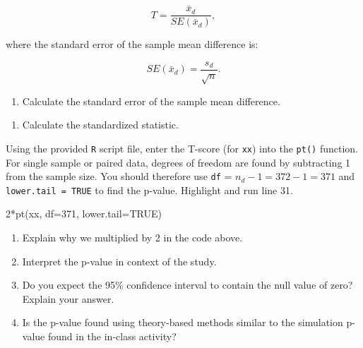 \documentclass[
]{report}
\newenvironment{Shaded}{\begin{snugshade}}{\end{snugshade}}
\newcommand{\AttributeTok}[1]{\textcolor[rgb]{0.77,0.63,0.00}{#1}}
\newcommand{\ConstantTok}[1]{\textcolor[rgb]{0.00,0.00,0.00}{#1}}
\newcommand{\DecValTok}[1]{\textcolor[rgb]{0.00,0.00,0.81}{#1}}
\newcommand{\FunctionTok}[1]{\textcolor[rgb]{0.00,0.00,0.00}{#1}}
\newcommand{\NormalTok}[1]{#1}
\newcommand{\SpecialCharTok}[1]{\textcolor[rgb]{0.00,0.00,0.00}{#1}}
\providecommand{\tightlist}{%
  \setlength{\itemsep}{0pt}\setlength{\parskip}{0pt}}
\begin{document}
\[T = \frac{\bar{x}_d}{SE(\bar{x}_d)},\]

where the standard error of the sample mean difference is:

\[SE(\bar{x}_d)=\frac{s_d}{\sqrt{n}}.\]

\begin{enumerate}
\def\labelenumi{\arabic{enumi}.}
\setcounter{enumi}{6}
\tightlist
\item
  Calculate the standard error of the sample mean difference.
\end{enumerate}

\vspace{0.5in}

\begin{enumerate}
\def\labelenumi{\arabic{enumi}.}
\setcounter{enumi}{7}
\tightlist
\item
  Calculate the standardized statistic.
\end{enumerate}

\vspace{0.5in}

Using the provided \texttt{R} script file, enter the T-score (for \texttt{xx}) into the \texttt{pt()} function. For single sample or paired data, degrees of freedom are found by subtracting 1 from the sample size. You should therefore use \texttt{df} = \(n_d-1 = 372 - 1 = 371\) and \texttt{lower.tail\ =\ TRUE} to find the p-value. Highlight and run line 31.

\begin{Shaded}
\begin{Highlighting}[]
\DecValTok{2}\SpecialCharTok{*}\FunctionTok{pt}\NormalTok{(xx, }\AttributeTok{df=}\DecValTok{371}\NormalTok{, }\AttributeTok{lower.tail=}\ConstantTok{TRUE}\NormalTok{)}
\end{Highlighting}
\end{Shaded}

\begin{enumerate}
\def\labelenumi{\arabic{enumi}.}
\setcounter{enumi}{8}
\item
  Explain why we multiplied by 2 in the code above.
  \vspace{0.3in}
\item
  Interpret the p-value in context of the study.
  \vspace{0.8in}
\item
  Do you expect the 95\% confidence interval to contain the null value of zero? Explain your answer.
  \vspace{0.8in}
\item
  Is the p-value found using theory-based methods similar to the simulation p-value found in the in-class activity?
\end{enumerate}
\end{document}
